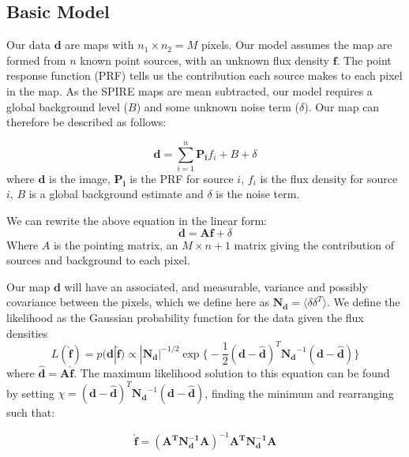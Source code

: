 \documentclass[useAMS,usenatbib]{mnras}
\begin{document}
\subsection{Basic Model}
Our data $\mathbf{d}$ are maps with $n_1 \times n_2 = M$ pixels. Our model assumes the map are formed from $n$ known point sources, with an unknown flux density $\mathbf{f}$. The point response function (PRF) tells us the contribution each source makes to each pixel in the map. As the SPIRE maps are mean subtracted, our model requires a global background level ($B$) and some unknown noise term ($\delta$). Our map can therefore be described as follows:

\begin{equation}
\mathbf{d} = \sum\limits_{i=1}^n \mathbf{P_i}f_i + B + \delta
\label{eq:map}
\end{equation}
where $\mathbf{d}$ is the image, $\mathbf{P_i}$ is the PRF for source $i$, $f_i$ is the flux density for source $i$, $B$ is a global background estimate and $\delta$ is the noise term.

We can rewrite the above equation in the linear form:
\begin{equation}
\mathbf{d} = \mathbf{Af} + \delta
\label{eq:map2}
\end{equation}
Where $A$ is the pointing matrix, an $M \times n+1$ matrix giving the contribution of sources and background to each pixel.

Our map $\mathbf{d}$ will have an associated, and measurable, variance and possibly covariance between the pixels, which we define here as $\mathbf{N_d} = \langle\delta\delta^T\rangle$. We define the likelihood as the Gaussian probability function for the data given the flux densities
\begin{equation}
L(\hat{\mathbf{f}}) = p(\mathbf{d}|\hat{\mathbf{f}}) \propto |\mathbf{N_d}|^{-1/2} \exp\big\{ -\frac{1}{2}(\mathbf{d}-\hat{\mathbf{d}})^T\mathbf{N_d}^{-1}(\mathbf{d}-\hat{\mathbf{d}})\big\}\label{eq:likelihood}
\end{equation}
where $\hat{\mathbf{d}}=\mathbf{A\hat{f}}$. The maximum likelihood solution to this equation can be found by setting $\chi = (\mathbf{d}-\hat{\mathbf{d}})^T\mathbf{N_d}^{-1}(\mathbf{d}-\hat{\mathbf{d}})$, finding the minimum and rearranging such that:

\begin{equation}
\hat{\mathbf{f}}=(\mathbf{A^TN_d^{-1}A})^{-1}\mathbf{A^TN_d^{-1}A}\label{eq:mlm}
\end{equation}
\end{document}
